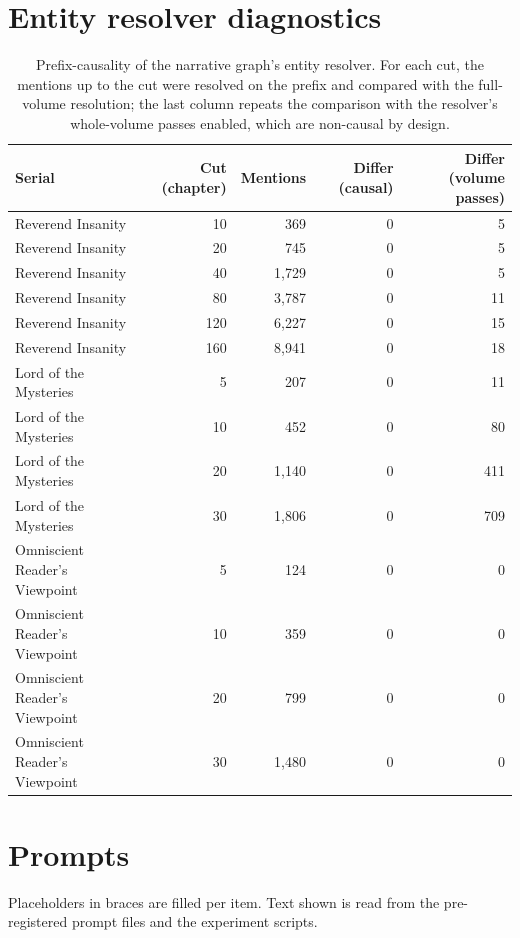\documentclass[11pt]{article}
\begin{document}
\section{Entity resolver diagnostics}
\begin{table}[!ht]
\centering
\scriptsize
\caption{Prefix-causality of the narrative graph's entity resolver. For each cut, the mentions up to the cut were resolved on the prefix and compared with the full-volume resolution; the last column repeats the comparison with the resolver's whole-volume passes enabled, which are non-causal by design.}\label{tab:s-resolver}
\begin{tabular}{lrrrr}
\toprule
Serial & Cut (chapter) & Mentions & Differ (causal) & Differ (volume passes) \\
\midrule
Reverend Insanity & 10 & 369 & 0 & 5 \\
Reverend Insanity & 20 & 745 & 0 & 5 \\
Reverend Insanity & 40 & 1,729 & 0 & 5 \\
Reverend Insanity & 80 & 3,787 & 0 & 11 \\
Reverend Insanity & 120 & 6,227 & 0 & 15 \\
Reverend Insanity & 160 & 8,941 & 0 & 18 \\
Lord of the Mysteries & 5 & 207 & 0 & 11 \\
Lord of the Mysteries & 10 & 452 & 0 & 80 \\
Lord of the Mysteries & 20 & 1,140 & 0 & 411 \\
Lord of the Mysteries & 30 & 1,806 & 0 & 709 \\
Omniscient Reader's Viewpoint & 5 & 124 & 0 & 0 \\
Omniscient Reader's Viewpoint & 10 & 359 & 0 & 0 \\
Omniscient Reader's Viewpoint & 20 & 799 & 0 & 0 \\
Omniscient Reader's Viewpoint & 30 & 1,480 & 0 & 0 \\
\bottomrule
\end{tabular}
\end{table}

\section{Prompts}
Placeholders in braces are filled per item. Text shown is read from the pre-registered prompt files and the experiment scripts.
\end{document}
